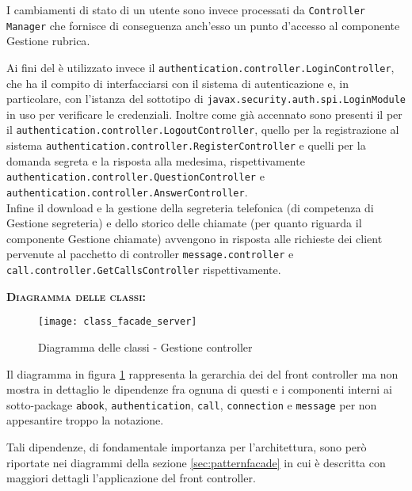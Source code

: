 \begin{description}
I cambiamenti di stato di un utente sono invece processati da \texttt{Controller Manager} che fornisce di conseguenza anch'esso un punto d'accesso al componente \textsf{Gestione rubrica}.

Ai fini del  è utilizzato invece il  \texttt{authentication.controller.LoginController}, che ha il compito di interfacciarsi con il sistema di autenticazione e, in particolare, con l'istanza del sottotipo di \texttt{javax.security.auth.spi.LoginModule} in uso per verificare le credenziali. Inoltre come già accennato sono presenti il  per il  \texttt{authentication.controller.LogoutController}, quello per la registrazione al sistema \texttt{authentication.controller.RegisterController} e quelli per la domanda segreta e la risposta alla medesima, rispettivamente \texttt{authentication.controller.QuestionController} e \texttt{authentication.controller.AnswerController}.\\

Infine il download e la gestione della segreteria telefonica (di competenza di \textsf{Gestione segreteria}) e dello storico delle chiamate (per quanto riguarda il componente \textsf{Gestione chiamate}) avvengono in risposta alle richieste dei client pervenute al pacchetto di controller \texttt{message.controller} e \texttt{call.controller.GetCallsController} rispettivamente. 

	\item{\scshape\bfseries Diagramma delle classi:}
\begin{figure}[H]
  \centering
  \texttt{[image: class\_facade\_server]}
  \caption{Diagramma delle classi - Gestione controller}\label{fig:facadeserver}
\end{figure}

Il diagramma in figura \ref{fig:facadeserver} rappresenta la gerarchia dei  del front controller ma non mostra in dettaglio le dipendenze fra ognuna di questi e i componenti interni ai sotto-package \texttt{abook}, \texttt{authentication}, \texttt{call}, \texttt{connection} e \texttt{message} per non appesantire troppo la notazione.

Tali dipendenze, di fondamentale importanza per l'architettura, sono però riportate nei diagrammi della sezione \vref{sec:patternfacade} in cui è descritta con maggiori dettagli l'applicazione del  front controller.
	

\end{description}

